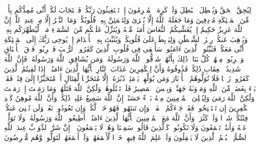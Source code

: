 \stopbuffer
\startbuffer[\q:8:8]
لِیُحِقَّ ٱلۡحَقَّ وَیُبۡطِلَ ٱلۡبَٰطِلَ وَلَوۡ كَرِهَ ٱلۡمُجۡرِمُونَ%
\stopbuffer
\startbuffer[\q:8:9]
إِذۡ تَسۡتَغِیثُونَ رَبَّكُمۡ فَٱسۡتَجَابَ لَكُمۡ أَنِّی مُمِدُّكُم بِأَلۡفࣲ مِّنَ ٱلۡمَلَٰۤئِكَةِ مُرۡدِفِینَ%
\stopbuffer
\startbuffer[\q:8:10]
وَمَا جَعَلَهُ ٱللَّهُ إِلَّا بُشۡرَىٰ وَلِتَطۡمَئِنَّ بِهِۦ قُلُوبُكُمۡۚ وَمَا ٱلنَّصۡرُ إِلَّا مِنۡ عِندِ ٱللَّهِۚ إِنَّ ٱللَّهَ عَزِیزٌ حَكِیمٌ%
\stopbuffer
\startbuffer[\q:8:11]
إِذۡ یُغَشِّیكُمُ ٱلنُّعَاسَ أَمَنَةࣰ مِّنۡهُ وَیُنَزِّلُ عَلَیۡكُم مِّنَ ٱلسَّمَاۤءِ مَاۤءࣰ لِّیُطَهِّرَكُم بِهِۦ وَیُذۡهِبَ عَنكُمۡ رِجۡزَ ٱلشَّیۡطَٰنِ وَلِیَرۡبِطَ عَلَىٰ قُلُوبِكُمۡ وَیُثَبِّتَ بِهِ ٱلۡأَقۡدَامَ%
\stopbuffer
\startbuffer[\q:8:12]
إِذۡ یُوحِی رَبُّكَ إِلَى ٱلۡمَلَٰۤئِكَةِ أَنِّی مَعَكُمۡ فَثَبِّتُوا۟ ٱلَّذِینَ ءَامَنُوا۟ۚ سَأُلۡقِی فِی قُلُوبِ ٱلَّذِینَ كَفَرُوا۟ ٱلرُّعۡبَ فَٱضۡرِبُوا۟ فَوۡقَ ٱلۡأَعۡنَاقِ وَٱضۡرِبُوا۟ مِنۡهُمۡ كُلَّ بَنَانࣲ%
\stopbuffer
\startbuffer[\q:8:13]
ذَٰلِكَ بِأَنَّهُمۡ شَاۤقُّوا۟ ٱللَّهَ وَرَسُولَهُۥۚ وَمَن یُشَاقِقِ ٱللَّهَ وَرَسُولَهُۥ فَإِنَّ ٱللَّهَ شَدِیدُ ٱلۡعِقَابِ%
\stopbuffer
\startbuffer[\q:8:14]
ذَٰلِكُمۡ فَذُوقُوهُ وَأَنَّ لِلۡكَٰفِرِینَ عَذَابَ ٱلنَّارِ%
\stopbuffer
\startbuffer[\q:8:15]
یَٰۤأَیُّهَا ٱلَّذِینَ ءَامَنُوۤا۟ إِذَا لَقِیتُمُ ٱلَّذِینَ كَفَرُوا۟ زَحۡفࣰا فَلَا تُوَلُّوهُمُ ٱلۡأَدۡبَارَ%
\stopbuffer
\startbuffer[\q:8:16]
وَمَن یُوَلِّهِمۡ یَوۡمَئِذࣲ دُبُرَهُۥۤ إِلَّا مُتَحَرِّفࣰا لِّقِتَالٍ أَوۡ مُتَحَیِّزًا إِلَىٰ فِئَةࣲ فَقَدۡ بَاۤءَ بِغَضَبࣲ مِّنَ ٱللَّهِ وَمَأۡوَىٰهُ جَهَنَّمُۖ وَبِئۡسَ ٱلۡمَصِیرُ%
\stopbuffer
\startbuffer[\q:8:17]
فَلَمۡ تَقۡتُلُوهُمۡ وَلَٰكِنَّ ٱللَّهَ قَتَلَهُمۡۚ وَمَا رَمَیۡتَ إِذۡ رَمَیۡتَ وَلَٰكِنَّ ٱللَّهَ رَمَىٰ وَلِیُبۡلِیَ ٱلۡمُؤۡمِنِینَ مِنۡهُ بَلَاۤءً حَسَنًاۚ إِنَّ ٱللَّهَ سَمِیعٌ عَلِیمࣱ%
\stopbuffer
\startbuffer[\q:8:18]
ذَٰلِكُمۡ وَأَنَّ ٱللَّهَ مُوهِنُ كَیۡدِ ٱلۡكَٰفِرِینَ%
\stopbuffer
\startbuffer[\q:8:19]
إِن تَسۡتَفۡتِحُوا۟ فَقَدۡ جَاۤءَكُمُ ٱلۡفَتۡحُۖ وَإِن تَنتَهُوا۟ فَهُوَ خَیۡرࣱ لَّكُمۡۖ وَإِن تَعُودُوا۟ نَعُدۡ وَلَن تُغۡنِیَ عَنكُمۡ فِئَتُكُمۡ شَیۡءࣰا وَلَوۡ كَثُرَتۡ وَأَنَّ ٱللَّهَ مَعَ ٱلۡمُؤۡمِنِینَ%
\stopbuffer
\startbuffer[\q:8:20]
یَٰۤأَیُّهَا ٱلَّذِینَ ءَامَنُوۤا۟ أَطِیعُوا۟ ٱللَّهَ وَرَسُولَهُۥ وَلَا تَوَلَّوۡا۟ عَنۡهُ وَأَنتُمۡ تَسۡمَعُونَ%
\stopbuffer
\startbuffer[\q:8:21]
وَلَا تَكُونُوا۟ كَٱلَّذِینَ قَالُوا۟ سَمِعۡنَا وَهُمۡ لَا یَسۡمَعُونَ%
\stopbuffer
\startbuffer[\q:8:22]
۞ إِنَّ شَرَّ ٱلدَّوَاۤبِّ عِندَ ٱللَّهِ ٱلصُّمُّ ٱلۡبُكۡمُ ٱلَّذِینَ لَا یَعۡقِلُونَ%
\stopbuffer
\startbuffer[\q:8:23]
وَلَوۡ عَلِمَ ٱللَّهُ فِیهِمۡ خَیۡرࣰا لَّأَسۡمَعَهُمۡۖ وَلَوۡ أَسۡمَعَهُمۡ لَتَوَلَّوا۟ وَّهُم مُّعۡرِضُونَ%
